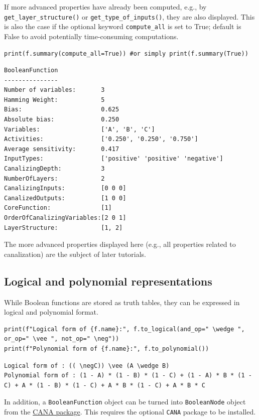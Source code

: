 \documentclass[
]{article}
\begin{document}
If more advanced properties have already been computed, e.g., by
\texttt{get\_layer\_structure()} or \texttt{get\_type\_of\_inputs()},
they are also displayed. This is also the case if the optional keyword
\texttt{compute\_all} is set to True; default is False to avoid
potentially time-consuming computations.

\begin{lstlisting}
print(f.summary(compute_all=True)) #or simply print(f.summary(True))
\end{lstlisting}

\begin{lstlisting}
BooleanFunction
---------------
Number of variables:       3
Hamming Weight:            5
Bias:                      0.625
Absolute bias:             0.250
Variables:                 ['A', 'B', 'C']
Activities:                ['0.250', '0.250', '0.750']
Average sensitivity:       0.417
InputTypes:                ['positive' 'positive' 'negative']
CanalizingDepth:           3
NumberOfLayers:            2
CanalizingInputs:          [0 0 0]
CanalizedOutputs:          [1 0 0]
CoreFunction:              [1]
OrderOfCanalizingVariables:[2 0 1]
LayerStructure:            [1, 2]
\end{lstlisting}

The more advanced properties displayed here (e.g., all properties
related to canalization) are the subject of later tutorials.

\subsection{Logical and polynomial
representations}\label{logical-and-polynomial-representations}

While Boolean functions are stored as truth tables, they can be
expressed in logical and polynomial format.

\begin{lstlisting}
print(f"Logical form of {f.name}:", f.to_logical(and_op=" \wedge ", or_op=" \vee ", not_op=" \neg"))
print(f"Polynomial form of {f.name}:", f.to_polynomial())
\end{lstlisting}

\begin{lstlisting}
Logical form of : (( \negC)) \vee (A \wedge B)
Polynomial form of : (1 - A) * (1 - B) * (1 - C) + (1 - A) * B * (1 - C) + A * (1 - B) * (1 - C) + A * B * (1 - C) + A * B * C
\end{lstlisting}

In addition, a \texttt{BooleanFunction} object can be turned into
\texttt{BooleanNode} object from the
\href{https://www.github.com/CASCI-lab/CANA}{CANA package}. This
requires the optional \texttt{CANA} package to be installed.
\end{document}
